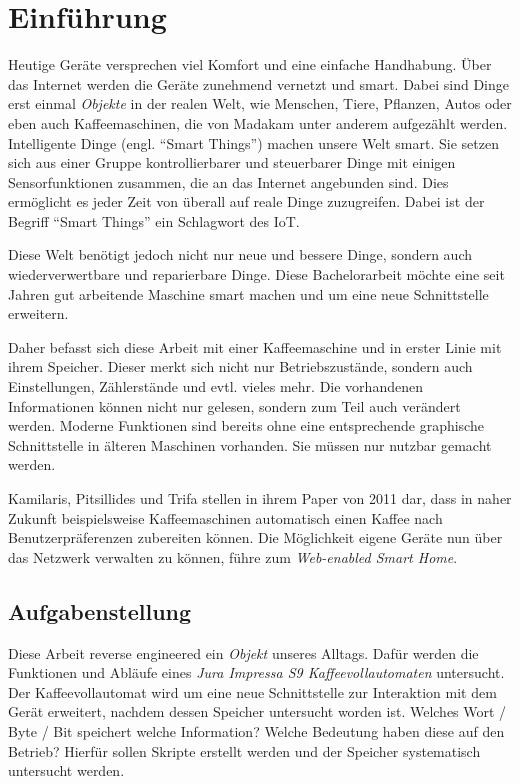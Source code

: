 \chapter{Einführung}
Heutige Geräte versprechen viel Komfort und eine einfache Handhabung. Über das Internet werden die Geräte zunehmend vernetzt und smart.
Dabei sind Dinge erst einmal \textit{Objekte} in der realen Welt, wie Menschen, Tiere, Pflanzen, Autos oder eben auch Kaffeemaschinen, die von Madakam \cite{Madakam2015} unter anderem aufgezählt werden.
Intelligente Dinge (engl. "`Smart Things"') machen unsere Welt smart.
Sie setzen sich aus einer Gruppe kontrollierbarer und steuerbarer Dinge mit einigen Sensorfunktionen zusammen, die an das Internet angebunden sind.
Dies ermöglicht es jeder Zeit von überall auf reale Dinge zuzugreifen.
Dabei ist der Begriff "`Smart Things"' ein Schlagwort des \ac{IoT}. \cite{Madakam2015}

Diese Welt benötigt jedoch nicht nur neue und bessere Dinge, sondern auch wiederverwertbare und reparierbare Dinge.
Diese Bachelorarbeit möchte eine seit Jahren gut arbeitende Maschine smart machen und um eine neue Schnittstelle erweitern.

Daher befasst sich diese Arbeit mit einer Kaffeemaschine und in erster Linie mit ihrem Speicher. Dieser merkt sich nicht nur Betriebszustände, sondern auch Einstellungen, Zählerstände und evtl. vieles mehr.
Die vorhandenen Informationen können nicht nur gelesen, sondern zum Teil auch verändert werden.
Moderne Funktionen sind bereits ohne eine entsprechende graphische Schnittstelle in älteren Maschinen vorhanden.
Sie müssen nur nutzbar gemacht werden.

Kamilaris, Pitsillides und Trifa stellen in ihrem Paper von 2011 \cite{Kamilaris2011} dar, dass in naher Zukunft beispielsweise Kaffeemaschinen automatisch einen Kaffee nach Benutzerpräferenzen zubereiten können.
Die Möglichkeit eigene Geräte nun über das Netzwerk verwalten zu können, führe zum \textit{Web-enabled Smart Home}.

\section{Aufgabenstellung}
Diese Arbeit reverse engineered ein \textit{Objekt} unseres Alltags.
Dafür werden die Funktionen und Abläufe eines \textit{Jura Impressa S9 Kaffeevollautomaten} untersucht.
Der Kaffeevollautomat wird um eine neue Schnittstelle zur Interaktion mit dem Gerät erweitert, nachdem dessen Speicher untersucht worden ist.
Welches Wort / Byte / Bit speichert welche Information? Welche Bedeutung haben diese auf den Betrieb?
Hierfür sollen Skripte erstellt werden und der Speicher systematisch untersucht werden.

